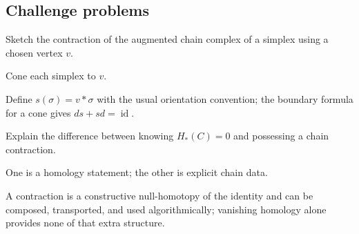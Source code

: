 \subsection*{Challenge problems}

\begin{exercise}\label{exr:viii23-ped-15}
Sketch the contraction of the augmented chain complex of a simplex using a chosen vertex $v$.
\end{exercise}
\begin{hint}
Cone each simplex to $v$.
\end{hint}
\begin{solution}
Define $s(\sigma)=v*\sigma$ with the usual orientation convention; the boundary formula for a cone gives $ds+sd=\operatorname{id}$.
\end{solution}

\begin{exercise}\label{exr:viii23-ped-16}
Explain the difference between knowing $H_*(C)=0$ and possessing a chain contraction.
\end{exercise}
\begin{hint}
One is a homology statement; the other is explicit chain data.
\end{hint}
\begin{solution}
A contraction is a constructive null-homotopy of the identity and can be composed, transported, and used algorithmically; vanishing homology alone provides none of that extra structure.
\end{solution}

